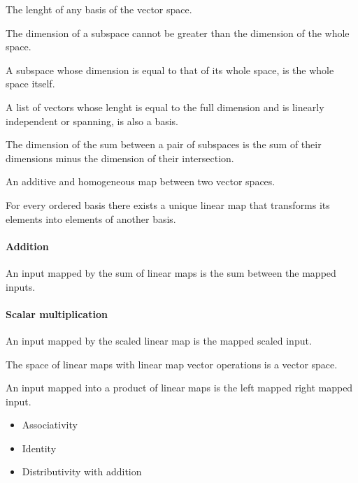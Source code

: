 \begin{multicols}{3}
  The lenght of any basis of the vector space.
  
  The dimension of a subspace cannot be greater than the dimension of the whole space.
  
  A subspace whose dimension is equal to that of its whole space, is the whole space itself.
  
  A list of vectors whose lenght is equal to the full dimension and is linearly independent or spanning, is also a basis.
  
  The dimension of the sum between a pair of subspaces is the sum of their dimensions minus the dimension of their intersection.

  An additive and homogeneous map between two vector spaces.

  For every ordered basis there exists a unique linear map that transforms its elements
  into elements of another basis.

  \paragraph{\textbf{Addition}}
  An input mapped by the sum of linear maps is the sum between the mapped inputs.
  \paragraph{\textbf{Scalar multiplication}}
  An input mapped by the scaled linear map is the mapped scaled input.
  
  The space of linear maps with linear map vector operations is a vector space.

  An input mapped into a product of linear maps is the left mapped right mapped input.

  \begin{itemize}
  \item Associativity
  \item Identity
  \item Distributivity with addition
  \end{itemize}


\end{multicols}
